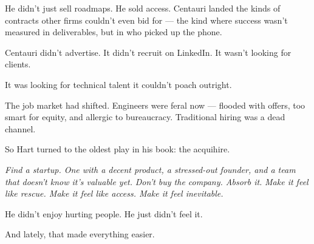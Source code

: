 He didn’t just sell roadmaps. He sold access.
Centauri landed the kinds of contracts other firms couldn’t even bid for —
the kind where success wasn’t measured in deliverables, but in who picked up the phone.

Centauri didn’t advertise. It didn’t recruit on LinkedIn. It wasn’t looking for clients.

It was looking for technical talent it couldn’t poach outright.

The job market had shifted. Engineers were feral now — flooded with offers, too smart for equity, and allergic to bureaucracy. Traditional hiring was a dead channel.

So Hart turned to the oldest play in his book: the acquihire.

\textit{Find a startup. One with a decent product, a stressed-out founder, and a team that doesn’t know it’s valuable yet.}
\textit{Don’t buy the company. Absorb it.}
\textit{Make it feel like rescue. Make it feel like access. Make it feel inevitable.}

\medskip

He didn’t enjoy hurting people. He just didn’t feel it.

And lately, that made everything easier.

\medskip

